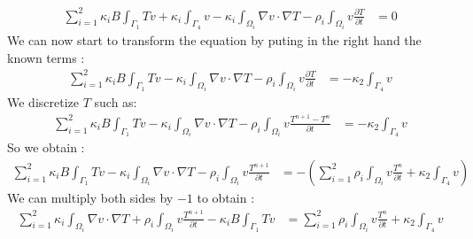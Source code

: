 \begin{equation}
   \begin{split}
 \displaystyle{\sum_{i=1}^{2} \kappa_i B \int_{\Gamma_1}{T v} + \kappa_i \int_{\Gamma_4} {v} - \kappa_i \int_{\varOmega_i} {\nabla v \cdot \nabla T}	- \rho_i \int_{\varOmega_i} v\frac{ \partial T}{\partial t}} & =   0 
  \end{split}
\end{equation}
We can now start to transform the equation by puting in the right hand the known terms :
\begin{equation}
   \begin{split}
 \displaystyle{\sum_{i=1}^{2} \kappa_i B \int_{\Gamma_1}{T v} - \kappa_i \int_{\varOmega_i} {\nabla v \cdot \nabla T}	- \rho_i \int_{\varOmega_i} v\frac{ \partial T}{\partial t}} & =  
 - \kappa_2 \int_{\Gamma_4} {v}	 
  \end{split}
\end{equation}
We discretize $T$ such as:
\begin{equation}
   \begin{split}
 \displaystyle{\sum_{i=1}^{2} \kappa_i B \int_{\Gamma_1}{T v} - \kappa_i \int_{\varOmega_i} {\nabla v \cdot \nabla T}	- \rho_i \int_{\varOmega_i} v\frac{T^{n+1} - T^n}{\partial t}} & =  
 - \kappa_2 \int_{\Gamma_4} {v}	 
  \end{split}
\end{equation}
So we obtain :
\begin{equation}
   \begin{split}
 \displaystyle{\sum_{i=1}^{2} \kappa_i B \int_{\Gamma_1}{T v} - \kappa_i \int_{\varOmega_i} {\nabla v \cdot \nabla T}	- \rho_i \int_{\varOmega_i} v\frac{T^{n+1}}{\partial t}} & =  
	\displaystyle{ - ( \sum_{i=1}^{2}  \rho_i \int_{\varOmega_i} v \frac{T^n}{\partial t} + \kappa_2 \int_{\Gamma_4} {v} )	 }
  \end{split}
\end{equation}
We can multiply both sides by $-1$ to obtain :
\begin{equation}
   \begin{split}
 \displaystyle{\sum_{i=1}^{2} \kappa_i \int_{\varOmega_i} {\nabla v \cdot \nabla T} + \rho_i \int_{\varOmega_i} v\frac{T^{n+1}}{\partial t} - \kappa_i B \int_{\Gamma_1}{T v} } & =  
	\displaystyle{ \sum_{i=1}^{2}  \rho_i \int_{\varOmega_i} v \frac{T^n}{\partial t} + \kappa_2 \int_{\Gamma_4} {v}  }
  \end{split}
\end{equation}

